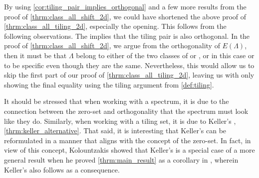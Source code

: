 \documentclass[../thesis.tex]{subfiles}
\begin{document}
\begin{remark}
    By using \cref{cor:tiling_pair_implies_orthogonal} and a few more results from the proof of \cref{thrm:class_all_shift_2d}, we could have shortened the above proof of \cref{thrm:class_all_tiling_2d}, especially the opening. This follows from the following observations. The  implies that the tiling pair is also orthogonal. In the proof of \cref{thrm:class_all_shift_2d}, we argue from the orthogonality of $E(\Lambda)$, then it must be that $\Lambda$ belong to either of the two classes of  or , or in this case  or  to be specific even though they are the same. Nevertheless, this would allow us to skip the first part of our proof of \cref{thrm:class_all_tiling_2d}, leaving us with only showing the final equality using the tiling argument from \cref{def:tiling}.
\end{remark}

It should be stressed that when working with a spectrum, it is due to the connection between the zero-set and orthogonality that the spectrum must look like they do. Similarly, when working with a tiling set, it is due to Keller's , \cref{thrm:keller_alternative}. That said, it is interesting that Keller's  can be reformulated in a manner that aligns with the concept of the zero-set. In fact, in view of this concept, Kolountzakis showed that Keller's  is a special case of a more general result when he proved \cref{thrm:main_result} as a corollary in \cite{kolountzakisPackingTilingOrthogonality2000}, wherein Keller's  also follows as a consequence.

\end{document}
